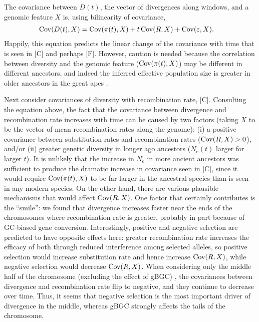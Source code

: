 The covariance between $D(t)$, the vector of divergences along windows, and a genomic feature $X$
is, using bilinearity of covariance,
\begin{align}
    \Cov(D(t),X) &= \Cov(\pi(t), X) + t\Cov(R,X) + \Cov(\varepsilon, X) \label{eqcov} . %
\end{align}
Happily, this equation predicts the linear change of the covariance with time that is seen in [C] and perhaps [F].
However, caution is needed because the correlation between diversity and the genomic feature ($\operatorname{Cov}(\pi(t), X)$)
may be different in different ancestors,
and indeed the inferred effective population size is greater in older ancestors in the great apes .

Next consider covariances of diversity with recombination rate, [C].
Consulting the equation above,
the fact that the covariance between divergence and recombination rate increases with time
can be caused by two factors (taking $X$ to be the vector of mean recombination rates along the genome):
(i) a positive covariance between substitution rates and recombination rates ($\operatorname{Cov}(R,X)>0$), and/or
(ii) greater genetic diversity in longer ago ancestors ($N_e(t)$ larger for larger $t$).
It is unlikely that the increase in $N_e$ in more ancient ancestors
was sufficient to produce the dramatic increase in covariance seen in [C],
since it would require $\operatorname{Cov}(\pi(t), X)$ to be far larger in the ancestral species
than is seen in any modern species.
On the other hand, there are various plausible mechanisms that would affect $\operatorname{Cov}(R, X)$.
One factor that certainly contributes is the ``smile'':
we found that divergence increases faster near the ends of the chromosomes
where recombination rate is greater,
probably in part because of GC-biased gene conversion.
Interestingly, positive and negative selection are predicted to have opposite effects here:
greater recombination rate increases the efficacy of both through reduced interference among selected alleles,
so positive selection would increase substitution rate and hence increase $\operatorname{Cov}(R, X)$,
while negative selection would decrease $\operatorname{Cov}(R, X)$.
When considering only the middle half of the chromosome (\ie excluding the effect of gBGC) ,
the covariances between divergence and recombination rate flip to negative, and they continue to decrease over time.
Thus, it seems that negative selection is the most important driver of divergence in the middle, whereas
gBGC strongly affects the tails of the chromosome.

